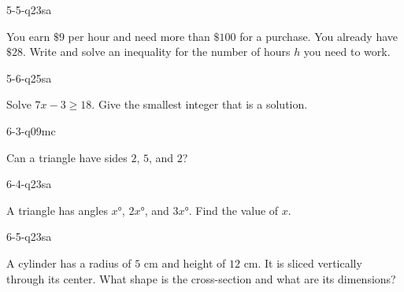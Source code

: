 \begin{practiceQuestion}{5-5-q23}{sa}
\begin{questionText}
You earn $\$9$ per hour and need more than $\$100$ for a purchase. You already have $\$28$. Write and solve an inequality for the number of hours $h$ you need to work.
\end{questionText}
\end{practiceQuestion}

\begin{practiceQuestion}{5-6-q25}{sa}
\begin{questionText}
Solve $7x - 3 \geq 18$. Give the smallest integer that is a solution.
\end{questionText}
\end{practiceQuestion}

\begin{practiceQuestion}{6-3-q09}{mc}
\begin{questionText}
Can a triangle have sides $2$, $5$, and $2$?
\end{questionText}
\end{practiceQuestion}

\begin{practiceQuestion}{6-4-q23}{sa}
\begin{questionText}
A triangle has angles $x°$, $2x°$, and $3x°$. Find the value of $x$.
\end{questionText}
\end{practiceQuestion}

\begin{practiceQuestion}{6-5-q23}{sa}
\begin{questionText}
A cylinder has a radius of $5$ cm and height of $12$ cm. It is sliced vertically through its center. What shape is the cross-section and what are its dimensions?
\end{questionText}
\end{practiceQuestion}

